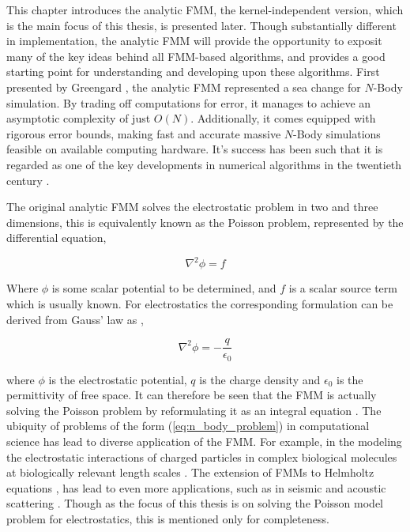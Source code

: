 This chapter introduces the analytic \gls{FMM}, the kernel-independent
version, which is the main focus of this thesis, is presented later.
Though substantially different in implementation, the analytic FMM will provide the opportunity
to exposit many of the key ideas behind all FMM-based algorithms, and provides
a good starting point for understanding and developing upon these algorithms.
First presented by Greengard \cite{Greengard:1987:JCP},
the analytic \gls{FMM} represented a sea change for $N$-Body simulation. By
trading off computations for error, it manages to achieve an asymptotic complexity
 of just $O(N)$. Additionally, it comes equipped with rigorous error bounds,
making fast and accurate massive $N$-Body simulations feasible on available
computing hardware. It's success has been such that it is regarded as one of
the key developments in numerical algorithms in the twentieth century \cite{Cipra:2000:SN}.

The original analytic FMM solves the electrostatic problem
in two and three dimensions, this is equivalently known as the Poisson problem,
represented by the differential equation,

\begin{equation}
    \nabla^2 \phi =f
\label{eq:poisson}
\end{equation}

Where $\phi$ is some scalar potential to be determined, and $f$ is a scalar source
term which is usually known. For electrostatics the corresponding formulation
can be derived from Gauss' law as \cite{Griffiths:2017:CUP},

\begin{equation}
  \nabla^2 \phi = - \frac{q}{\epsilon_0}
\label{eq:electrostatic_poisson}
\end{equation}

where $\phi$ is the electrostatic potential, $q$ is the charge density and
$\epsilon_0$ is the permittivity of free space. It can therefore be seen that
the \gls{FMM} is actually solving the Poisson problem by reformulating it as an
integral equation \cite{Epton:1995:SIAM}. The ubiquity of problems of the form (\ref{eq:n_body_problem})
in computational science has lead to diverse application of the FMM. For example,
in the modeling the electrostatic interactions of charged particles in complex
biological molecules at biologically relevant length scales \cite{Board:1992:CPL}.
The extension of FMMs to Helmholtz equations \cite{Rokhlin:1990:JCP}, has lead
to even more applications, such as in seismic and acoustic scattering
\cite{Hwu:2011:MKP}. Though as the focus of this thesis is on solving the Poisson
model problem for electrostatics, this is mentioned only for completeness.

